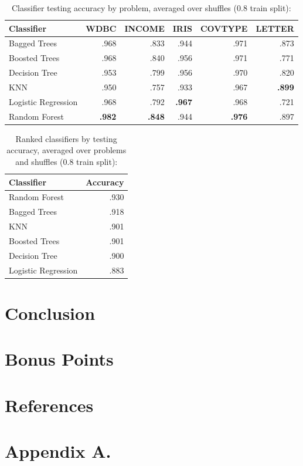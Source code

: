 \documentclass[twoside,11pt]{article}
\begin{document}
			\begin{table}[h]
				\caption{Classifier testing accuracy by problem, averaged over shuffles (0.8 train split):}
				\begin{tabular}{lrrrrr}
					\toprule
					Classifier & WDBC & INCOME & IRIS & COVTYPE & LETTER \\
					\midrule
					Bagged Trees  & .968 &   .833 & .944 &    .971 &   .873 \\
					Boosted Trees  & .968 &   .840 & .956 &    .971 &   .771 \\
					Decision Tree     & .953 &   .799 & .956 &    .970 &   .820 \\
					KNN    & .950 &   .757 & .933 &    .967 &   \textbf{.899} \\
					Logistic Regression & .968 &   .792 & \textbf{.967} &    .968 &   .721 \\
					Random Forest     & \textbf{.982} &   \textbf{.848} & .944 &    \textbf{.976} &   .897 \\
					\bottomrule
				\end{tabular}
			\end{table}
		
			\begin{table}[h]
				\caption{Ranked classifiers by testing accuracy, averaged over problems and shuffles (0.8 train split):}
				\label{tab:clf_ranking}
				\begin{tabular}{lr}
					\toprule
					{Classifier} & Accuracy \\
					\midrule
					Random Forest     &     .930 \\
					Bagged Trees  &     .918 \\
					KNN    &     .901 \\
					Boosted Trees  &     .901 \\
					Decision Tree     &     .900 \\
					Logistic Regression &     .883 \\
					\bottomrule
				\end{tabular}
			\end{table}
	
	\section{Conclusion}
	
	\section{Bonus Points}
	
	\section{References}
	
	
	
	
	
	
	
	\newpage
	
	\appendix
	\section*{Appendix A.}
	\label{app:theorem}
	
	
	
	\vskip 0.2in
	
	
\end{document}
